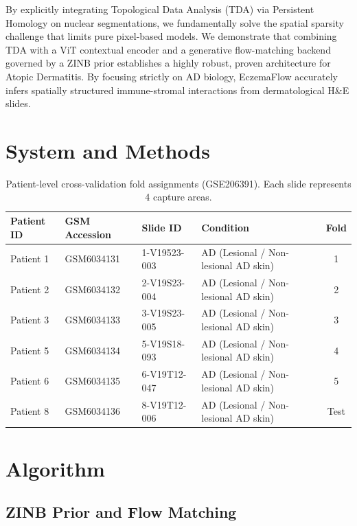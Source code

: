 \documentclass{bioinfo}
\begin{document}
By explicitly integrating Topological Data Analysis (TDA) via Persistent Homology on nuclear segmentations, we fundamentally solve the spatial sparsity challenge that limits pure pixel-based models. We demonstrate that combining TDA with a ViT contextual encoder and a generative flow-matching backend \cite{lipman2022flow} governed by a ZINB prior establishes a highly robust, proven architecture for Atopic Dermatitis. By focusing strictly on AD biology, EczemaFlow accurately infers spatially structured immune-stromal interactions from dermatological H\&E slides.

\section{System and Methods}


\begin{table}[h]
    \centering
    \caption{Patient-level cross-validation fold assignments (GSE206391). Each slide represents 4 capture areas.}
    \label{tab:splits}
    \begin{tabular}{llllc}
        \toprule
        \textbf{Patient ID} & \textbf{GSM Accession} & \textbf{Slide ID} & \textbf{Condition} & \textbf{Fold} \\
        \midrule
        Patient 1 & GSM6034131 & 1-V19523-003 & AD (Lesional / Non-lesional AD skin) & 1 \\
        Patient 2 & GSM6034132 & 2-V19S23-004 & AD (Lesional / Non-lesional AD skin) & 2 \\
        Patient 3 & GSM6034133 & 3-V19S23-005 & AD (Lesional / Non-lesional AD skin) & 3 \\
        Patient 5 & GSM6034134 & 5-V19S18-093 & AD (Lesional / Non-lesional AD skin) & 4 \\
        Patient 6 & GSM6034135 & 6-V19T12-047 & AD (Lesional / Non-lesional AD skin) & 5 \\
        Patient 8 & GSM6034136 & 8-V19T12-006 & AD (Lesional / Non-lesional AD skin) & Test \\
        \bottomrule
    \end{tabular}
\end{table}

\section{Algorithm}

\subsection{ZINB Prior and Flow Matching}
\end{document}
